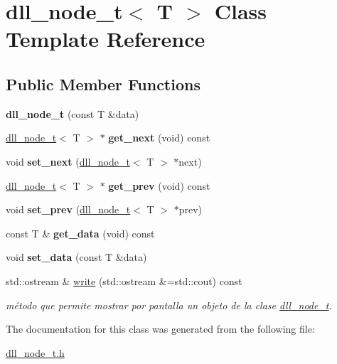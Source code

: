 \hypertarget{classdll__node__t}{}\section{dll\+\_\+node\+\_\+t$<$ T $>$ Class Template Reference}
\label{classdll__node__t}
\subsection*{Public Member Functions}
\begin{DoxyCompactItemize}
\item 
\mbox{\label{classdll__node__t_a8ad3f0c9aeca25b547093cd43ab39bdd}} 
{\bfseries dll\+\_\+node\+\_\+t} (const T \&data)
\item 
\mbox{\label{classdll__node__t_a7a75a1c63b1f15de3cbfd83479e32b99}} 
\hyperlink{classdll__node__t}{dll\+\_\+node\+\_\+t}$<$ T $>$ $\ast$ {\bfseries get\+\_\+next} (void) const
\item 
\mbox{\label{classdll__node__t_a9e7a78128da34e79ca7ee4266ec116a8}} 
void {\bfseries set\+\_\+next} (\hyperlink{classdll__node__t}{dll\+\_\+node\+\_\+t}$<$ T $>$ $\ast$next)
\item 
\mbox{\label{classdll__node__t_af12e8a2cdc28786fd18c729f968367ce}} 
\hyperlink{classdll__node__t}{dll\+\_\+node\+\_\+t}$<$ T $>$ $\ast$ {\bfseries get\+\_\+prev} (void) const
\item 
\mbox{\label{classdll__node__t_a8fc8e7d5f3e881181260328352647aa4}} 
void {\bfseries set\+\_\+prev} (\hyperlink{classdll__node__t}{dll\+\_\+node\+\_\+t}$<$ T $>$ $\ast$prev)
\item 
\mbox{\label{classdll__node__t_a34a2079a42af2de32faac774fe9dc6d0}} 
const T \& {\bfseries get\+\_\+data} (void) const
\item 
\mbox{\label{classdll__node__t_ae9d57ebe07151a8b4012f1616547d638}} 
void {\bfseries set\+\_\+data} (const T \&data)
\item 
\mbox{\label{classdll__node__t_a5fbd6729e11dfb013722d3e6d1ce2db5}} 
std\+::ostream \& \hyperlink{classdll__node__t_a5fbd6729e11dfb013722d3e6d1ce2db5}{write} (std\+::ostream \&=std\+::cout) const
\begin{DoxyCompactList}\small\item\em método que permite mostrar por pantalla un objeto de la clase \hyperlink{classdll__node__t}{dll\+\_\+node\+\_\+t}. \end{DoxyCompactList}\end{DoxyCompactItemize}


The documentation for this class was generated from the following file\+:\begin{DoxyCompactItemize}
\item 
\hyperlink{dll__node__t_8h}{dll\+\_\+node\+\_\+t.\+h}\end{DoxyCompactItemize}
